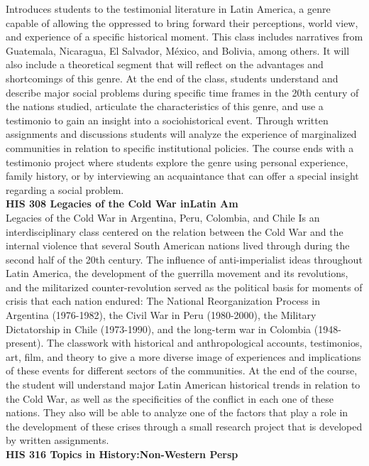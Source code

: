 \documentclass[
  letterpaper,
]{scrbook}
\begin{document}
Introduces students to the testimonial literature in Latin America, a
genre capable of allowing the oppressed to bring forward their
perceptions, world view, and experience of a specific historical moment.
This class includes narratives from Guatemala, Nicaragua, El Salvador,
México, and Bolivia, among others. It will also include a theoretical
segment that will reflect on the advantages and shortcomings of this
genre. At the end of the class, students understand and describe major
social problems during specific time frames in the 20th century of the
nations studied, articulate the characteristics of this genre, and use a
testimonio to gain an insight into a sociohistorical event. Through
written assignments and discussions students will analyze the experience
of marginalized communities in relation to specific institutional
policies. The course ends with a testimonio project where students
explore the genre using personal experience, family history, or by
interviewing an acquaintance that can offer a special insight regarding
a social problem.\\
\textbf{HIS 308 Legacies of the Cold War inLatin Am}\\
Legacies of the Cold War in Argentina, Peru, Colombia, and Chile Is an
interdisciplinary class centered on the relation between the Cold War
and the internal violence that several South American nations lived
through during the second half of the 20th century. The influence of
anti-imperialist ideas throughout Latin America, the development of the
guerrilla movement and its revolutions, and the militarized
counter-revolution served as the political basis for moments of crisis
that each nation endured: The National Reorganization Process in
Argentina (1976-1982), the Civil War in Peru (1980-2000), the Military
Dictatorship in Chile (1973-1990), and the long-term war in Colombia
(1948-present). The classwork with historical and anthropological
accounts, testimonios, art, film, and theory to give a more diverse
image of experiences and implications of these events for different
sectors of the communities. At the end of the course, the student will
understand major Latin American historical trends in relation to the
Cold War, as well as the specificities of the conflict in each one of
these nations. They also will be able to analyze one of the factors that
play a role in the development of these crises through a small research
project that is developed by written assignments.\\
\textbf{HIS 316 Topics in History:Non-Western Persp}\\
\end{document}
